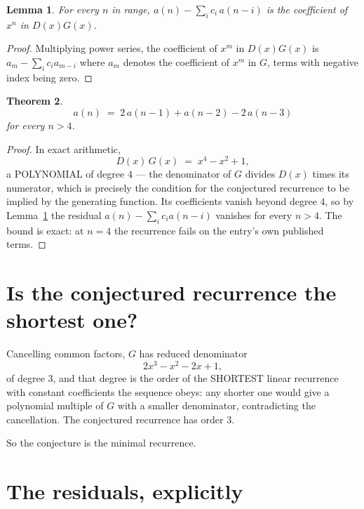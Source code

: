 \documentclass[11pt,a4paper]{article}
\theoremstyle{plain}
\newtheorem{theorem}{Theorem}
\newtheorem{lemma}[theorem]{Lemma}
\theoremstyle{definition}
\begin{document}
\begin{lemma}\label{lem:key}
For every $n$ in range, $a(n)-\sum_i c_i\,a(n-i)$ is the coefficient of $x^{n}$ in
$D(x)G(x)$.
\end{lemma}

\begin{proof}
Multiplying power series, the coefficient of $x^{m}$ in $D(x)G(x)$ is
$a_m-\sum_i c_i a_{m-i}$ where $a_m$ denotes the coefficient of $x^{m}$ in $G$, terms with
negative index being zero.
\end{proof}

\begin{theorem}
\[
a(n)\;=\;2\,a(n-1) + a(n-2) - 2\,a(n-3)
\]
for every $n>4$.
\end{theorem}

\begin{proof}
In exact arithmetic,
\[
D(x)\,G(x)\;=\;x^{4} - x^{2} + 1,
\]
a POLYNOMIAL of degree $4$ --- the denominator of $G$ divides $D(x)$ times its numerator,
which is precisely the condition for the conjectured recurrence to be implied by the
generating function. Its coefficients vanish beyond degree $4$, so by
Lemma~\ref{lem:key} the residual $a(n)-\sum_ic_ia(n-i)$ vanishes for every
$n>4$. The bound is exact: at $n=4$ the recurrence fails on the entry's own published terms.
\end{proof}

\section{Is the conjectured recurrence the shortest one?}

Cancelling common factors, $G$ has reduced denominator
\[
2 x^{3} - x^{2} - 2 x + 1,
\]
of degree $3$, and that degree is the order of the SHORTEST linear recurrence with
constant coefficients the sequence obeys: any shorter one would give a polynomial multiple of
$G$ with a smaller denominator, contradicting the cancellation. The conjectured recurrence has
order $3$.

So the conjecture is the minimal recurrence.

\section{The residuals, explicitly}
\end{document}
